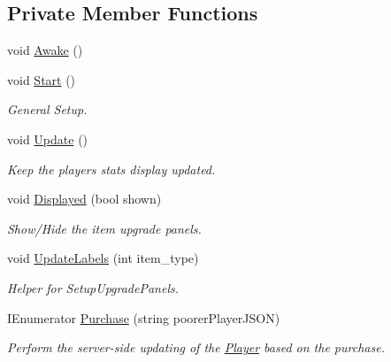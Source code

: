 \subsection*{Private Member Functions}
\begin{DoxyCompactItemize}
\item 
void \mbox{\hyperlink{class_inventory_a88da279faf84d529af011f7e25bea01b}{Awake}} ()
\item 
void \mbox{\hyperlink{class_inventory_aa5a9d430aff1ecd12a75901608d337ea}{Start}} ()
\begin{DoxyCompactList}\small\item\em General Setup. \end{DoxyCompactList}\item 
void \mbox{\hyperlink{class_inventory_a7b1e7148da0c7b5e4d87b6ea07dce086}{Update}} ()
\begin{DoxyCompactList}\small\item\em Keep the player\textquotesingle{}s stats display updated. \end{DoxyCompactList}\item 
void \mbox{\hyperlink{class_inventory_a6a6906197f22590ffa086d4aca935dc3}{Displayed}} (bool shown)
\begin{DoxyCompactList}\small\item\em Show/\+Hide the item upgrade panels. \end{DoxyCompactList}\item 
void \mbox{\hyperlink{class_inventory_a5ff170daf3d949c611d8e064626524e2}{Update\+Labels}} (int item\+\_\+type)
\begin{DoxyCompactList}\small\item\em Helper for Setup\+Upgrade\+Panels. \end{DoxyCompactList}\item 
I\+Enumerator \mbox{\hyperlink{class_inventory_a6be0d5d14468b2eb9cba732c3f65c3e5}{Purchase}} (string poorer\+Player\+J\+S\+ON)
\begin{DoxyCompactList}\small\item\em Perform the server-\/side updating of the \mbox{\hyperlink{class_player}{Player}} based on the purchase. \end{DoxyCompactList}\end{DoxyCompactItemize}

